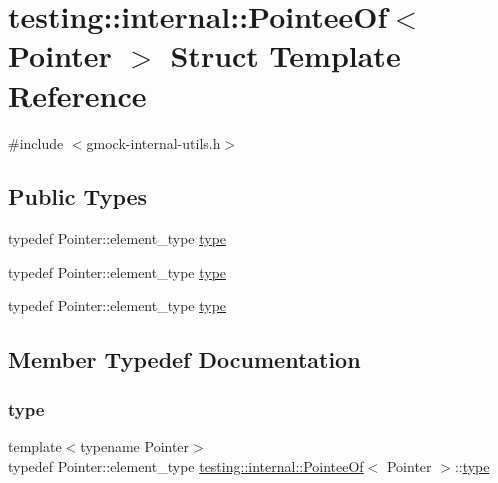 \hypertarget{structtesting_1_1internal_1_1_pointee_of}{}\section{testing\+::internal\+::Pointee\+Of$<$ Pointer $>$ Struct Template Reference}
\label{structtesting_1_1internal_1_1_pointee_of}


{\ttfamily \#include $<$gmock-\/internal-\/utils.\+h$>$}

\subsection*{Public Types}
\begin{DoxyCompactItemize}
\item 
typedef Pointer\+::element\+\_\+type \mbox{\hyperlink{structtesting_1_1internal_1_1_pointee_of_aca4d92c8f978e47a8695e82cffc11837}{type}}
\item 
typedef Pointer\+::element\+\_\+type \mbox{\hyperlink{structtesting_1_1internal_1_1_pointee_of_aca4d92c8f978e47a8695e82cffc11837}{type}}
\item 
typedef Pointer\+::element\+\_\+type \mbox{\hyperlink{structtesting_1_1internal_1_1_pointee_of_aca4d92c8f978e47a8695e82cffc11837}{type}}
\end{DoxyCompactItemize}


\subsection{Member Typedef Documentation}
\mbox{\label{structtesting_1_1internal_1_1_pointee_of_aca4d92c8f978e47a8695e82cffc11837}} 
\subsubsection{\texorpdfstring{type}{type}\hspace{0.1cm}{\footnotesize\ttfamily [1/3]}}
{\footnotesize\ttfamily template$<$typename Pointer$>$ \\
typedef Pointer\+::element\+\_\+type \mbox{\hyperlink{structtesting_1_1internal_1_1_pointee_of}{testing\+::internal\+::\+Pointee\+Of}}$<$ Pointer $>$\+::\mbox{\hyperlink{structtesting_1_1internal_1_1_pointee_of_aca4d92c8f978e47a8695e82cffc11837}{type}}}

